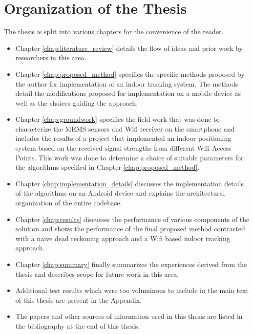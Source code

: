 \section{Organization of the Thesis}

The thesis is split into various chapters for the convenience of the reader.

\begin{itemize}
\item Chapter \ref{chap:literature_review} details the flow of ideas and prior
work by researchers in this area.

\item Chapter \ref{chap:proposed_method} specifies the specific methods proposed
by the author for implementation of an indoor tracking system. The methods
detail the modifications proposed for implementation on a mobile device as well
as the choices guiding the approach.

\item Chapter \ref{chap:groundwork} specifies the field work that was done to
characterize the MEMS sensors and Wifi receiver on the smartphone and includes
the results of a project that implemented an indoor positioning system based on
the received signal strengths from different Wifi Access Points. This work was
done to determine a choice of suitable parameters for the algorithms specified
in Chapter \ref{chap:proposed_method}.

\item Chapter \ref{chap:implementation_details} discusses the implementation
details of the algorithms on an Android device and explains the architectural
organization of the entire codebase.

\item Chapter \ref{chap:results} discusses the performance of various components
of the solution and shows the performance of the final proposed method
contrasted with a naive dead reckoning approach and a Wifi based indoor tracking
approach.

\item Chapter \ref{chap:summary} finally summarizes the experiences derived from
the thesis and describes scope for future work in this area.

\item Additional test results which were
too voluminous to include in the main text of this thesis are present in 
the Appendix.

\item The papers and other sources of information used in this thesis are listed
in the bibliography at the end of this thesis.
\end{itemize}
